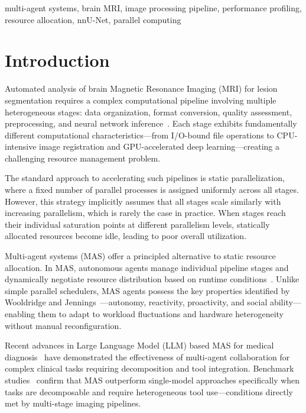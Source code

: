 \documentclass[conference]{IEEEtran}
\begin{document}
\begin{IEEEkeywords}
multi-agent systems, brain MRI, image processing pipeline, performance profiling, resource allocation, nnU-Net, parallel computing
\end{IEEEkeywords}

\section{Introduction}

Automated analysis of brain Magnetic Resonance Imaging (MRI) for lesion segmentation requires a complex computational pipeline involving multiple heterogeneous stages: data organization, format conversion, quality assessment, preprocessing, and neural network inference~\cite{isensee2021}. Each stage exhibits fundamentally different computational characteristics---from I/O-bound file operations to CPU-intensive image registration and GPU-accelerated deep learning---creating a challenging resource management problem.

The standard approach to accelerating such pipelines is static parallelization, where a fixed number of parallel processes is assigned uniformly across all stages. However, this strategy implicitly assumes that all stages scale similarly with increasing parallelism, which is rarely the case in practice. When stages reach their individual saturation points at different parallelism levels, statically allocated resources become idle, leading to poor overall utilization.

Multi-agent systems (MAS) offer a principled alternative to static resource allocation. In MAS, autonomous agents manage individual pipeline stages and dynamically negotiate resource distribution based on runtime conditions~\cite{wooldridge2009}. Unlike simple parallel schedulers, MAS agents possess the key properties identified by Wooldridge and Jennings~\cite{wooldridge1995}---autonomy, reactivity, proactivity, and social ability---enabling them to adapt to workload fluctuations and hardware heterogeneity without manual reconfiguration.

Recent advances in Large Language Model (LLM) based MAS for medical diagnosis~\cite{tang2024,kim2024} have demonstrated the effectiveness of multi-agent collaboration for complex clinical tasks requiring decomposition and tool integration. Benchmark studies~\cite{zhu2025} confirm that MAS outperform single-model approaches specifically when tasks are decomposable and require heterogeneous tool use---conditions directly met by multi-stage imaging pipelines.
\end{document}
